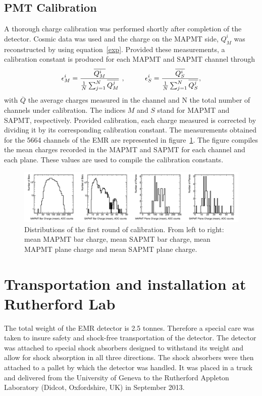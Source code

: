 \documentclass[a4paper,11pt]{article}
\begin{document}
\subsection{PMT Calibration}\label{sec:calib}
A thorough charge calibration was performed shortly after completion of the detector. Cosmic data was used and the charge on the MAPMT side, $Q_M^i$ was
reconstructed by using equation~\ref{exp}. Provided these measurements, a calibration constant is produced for each MAPMT and SAPMT channel through
\begin{equation}
\epsilon_M^i=\frac{\overline{Q_M^i}}{\frac{1}{N}\sum_{j=1}^N\overline{Q_M^j}}\ , \hspace{10mm} \epsilon_S^i=\frac{\overline{Q_S^i}}{\frac{1}{N}\sum_{j=1}^N\overline{Q_S^j}},
\end{equation}
with $\overline{Q}$ the average charges measured in the channel and N the total number of channels under calibration. The indices $M$ and $S$ stand for MAPMT
and SAPMT, respectively. Provided calibration, each charge measured is corrected by dividing it by its corresponding calibration constant.
The measurements obtained for the 5664 channels of the EMR are represented in figure~\ref{fig:calib}. The figure compiles the mean charges
recorded in the MAPMT and SAPMT for each channel and each plane. These values are used to compile the calibration constants.

\begin{figure}[htb]
\centering
\includegraphics[width=\textwidth]{calibration_charge_distrib_cut.png}
\caption{Distributions of the first round of calibration. From left to right: mean MAPMT bar charge, mean SAPMT bar charge, mean MAPMT plane charge and mean
SAPMT plane charge.}
\label{fig:calib}
\end{figure}

\section{Transportation and installation at Rutherford Lab}
The total weight of the EMR detector is 2.5 tonnes. Therefore a special care was taken to insure safety and shock-free transportation of the detector.
The detector was attached to special shock absorbers \cite{shockabsorbers} designed to withstand its weight and allow for shock absorption in all three
directions. The shock absorbers were then attached to a pallet by which the detector was handled. It was placed in a truck and delivered from the
University of Geneva to the Rutherford Appleton Laboratory (Didcot, Oxfordshire, UK) in September 2013.
\end{document}
